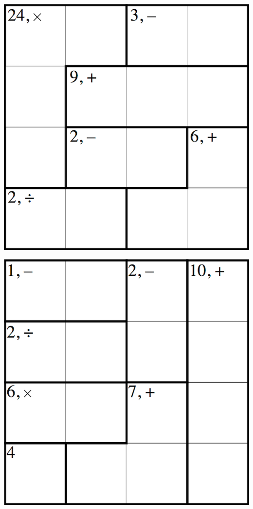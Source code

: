 
\includegraphics[scale=1]{Gambar/Lampiran/4x4_3.png}

\includegraphics[scale=1]{Gambar/Lampiran/4x4_4.png}
